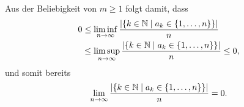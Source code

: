 \documentclass[a4paper,10pt]{article}
\begin{document}
Aus der Beliebigkeit von $m \geq 1$ folgt damit, dass
\begin{align*}
 0 
 &\leq \liminf_{n \to \infty} \frac{|\{k \in \mathbb{N} \mid a_k \in \{1, \dotsc, n\}\}|}{n} \\
 &\leq \limsup_{n \to \infty} \frac{|\{k \in \mathbb{N} \mid a_k \in \{1, \dotsc, n\}\}|}{n}
 \leq 0,
\end{align*}
und somit bereits
\[
 \lim_{n \to \infty} \frac{|\{k \in \mathbb{N} \mid a_k \in \{1, \dotsc, n\}\}|}{n} = 0.
\]
\end{document}
